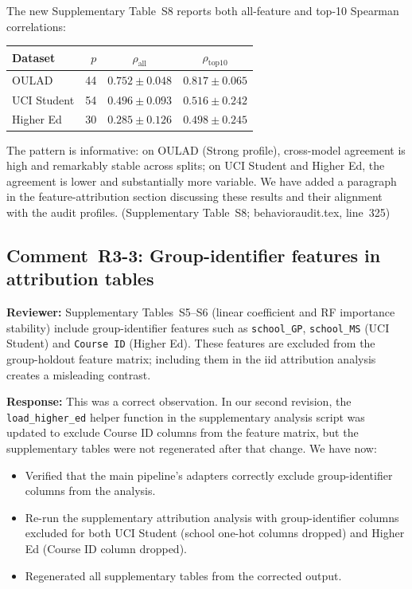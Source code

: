 \documentclass[10pt,letterpaper]{article}
\begin{document}
The new Supplementary Table~S8 reports both all-feature and top-10
Spearman correlations:

\begin{center}
\small
\begin{tabular}{l r c c}
\toprule
Dataset & $p$ & $\rho_{\mathrm{all}}$ & $\rho_{\mathrm{top10}}$ \\
\midrule
OULAD & 44 & $0.752 \pm 0.048$ & $0.817 \pm 0.065$ \\
UCI Student & 54 & $0.496 \pm 0.093$ & $0.516 \pm 0.242$ \\
Higher Ed & 30 & $0.285 \pm 0.126$ & $0.498 \pm 0.245$ \\
\bottomrule
\end{tabular}
\end{center}

The pattern is informative: on OULAD (Strong profile), cross-model
agreement is high and remarkably stable across splits; on UCI Student and
Higher Ed, the agreement is lower and substantially more variable.  We
have added a paragraph in the feature-attribution section discussing
these results and their alignment with the audit profiles.
  (Supplementary Table~S8; behavioraudit.tex, line~325)

\subsection*{Comment~R3-3: Group-identifier features in attribution tables}

\textbf{Reviewer:} Supplementary Tables~S5--S6 (linear coefficient and RF
importance stability) include group-identifier features such as
\texttt{school\_GP}, \texttt{school\_MS} (UCI Student) and
\texttt{Course ID} (Higher Ed).  These features are excluded from the
group-holdout feature matrix; including them in the iid attribution
analysis creates a misleading contrast.

\textbf{Response:} This was a correct observation.  In our second
revision, the \texttt{load\_higher\_ed} helper function in the
supplementary analysis script was updated to exclude Course ID columns
from the feature matrix, but the supplementary tables were not
regenerated after that change.  We have now:

\begin{itemize}
\item Verified that the main pipeline's adapters correctly exclude
  group-identifier columns from the analysis.
\item Re-run the supplementary attribution analysis with group-identifier
  columns excluded for both UCI Student (school one-hot columns dropped)
  and Higher Ed (Course ID column dropped).
\item Regenerated all supplementary tables from the corrected output.
\end{itemize}
\end{document}
